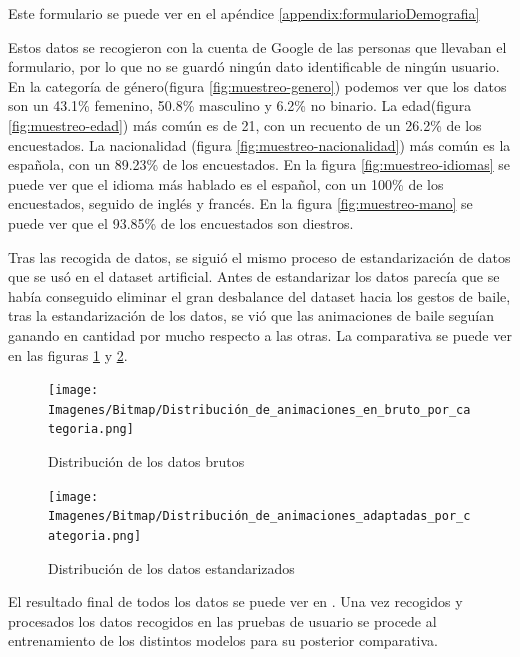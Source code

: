 Este formulario se puede ver en el apéndice \ref{appendix:formularioDemografia}

Estos datos se recogieron con la cuenta de Google de las personas que llevaban el formulario, por lo que no se guardó ningún dato identificable de ningún usuario. En la categoría de género(figura \ref{fig:muestreo-genero}) podemos ver que los datos son un 43.1\% femenino, 50.8\% masculino y 6.2\% no binario. La edad(figura \ref{fig:muestreo-edad}) más común es de 21, con un recuento de un 26.2\% de los encuestados. La nacionalidad (figura \ref{fig:muestreo-nacionalidad}) más común es la española, con un 89.23\% de los encuestados. En la figura \ref{fig:muestreo-idiomas} se puede ver que el idioma más hablado es el español, con un 100\% de los encuestados, seguido de inglés y francés. En la figura \ref{fig:muestreo-mano} se puede ver que el 93.85\% de los encuestados son diestros.

Tras las recogida de datos, se siguió el mismo proceso de estandarización de datos que se usó en el dataset artificial. Antes de estandarizar los datos parecía que se había conseguido eliminar el gran desbalance del dataset hacia los gestos de baile, tras la estandarización de los datos, se vió que las animaciones de baile seguían ganando en cantidad por mucho respecto a las otras. La comparativa se puede ver en las figuras \ref{fig:datos-bruto} y \ref{fig:datos-estandar}.

\begin{figure}[H]
	\centering
	\texttt{[image: Imagenes/Bitmap/Distribución\_de\_animaciones\_en\_bruto\_por\_categoria.png]}
	\caption{Distribución de los datos brutos}
	\label{fig:datos-bruto}
\end{figure}

\begin{figure}[H]
	\centering
	\texttt{[image: Imagenes/Bitmap/Distribución\_de\_animaciones\_adaptadas\_por\_categoria.png]}
	\caption{Distribución de los datos estandarizados}
	\label{fig:datos-estandar}
\end{figure}

El resultado final de todos los datos se puede ver en \cite{csv-pose-animations}. Una vez recogidos y procesados los datos recogidos en las pruebas de usuario se procede al entrenamiento de los distintos modelos para su posterior comparativa.